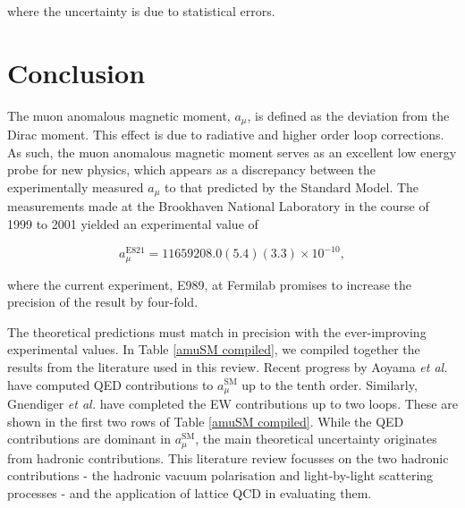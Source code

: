 \documentclass{article}
\numberwithin{equation}{section} %
\begin{document}
\noindent where the uncertainty is due to statistical errors.

\section{Conclusion}

The muon anomalous magnetic moment, $a_\mu$, is defined as the deviation from the Dirac moment\cite{zee}. This effect is due to radiative and higher order loop corrections. As such, the muon anomalous magnetic moment serves as an excellent low energy probe for new physics\cite{millerg2}, which appears as a discrepancy between the experimentally measured $a_\mu$ to that predicted by the Standard Model. The measurements made at the Brookhaven National Laboratory in the course of 1999 to 2001 yielded an experimental value of \cite{millerg2}

\begin{equation}
a_\mu^{\mathrm{E821}} = 11 659 208.0(5.4)(3.3) \times 10^{-10},
\end{equation}

\noindent where the current experiment, E989, at Fermilab promises to increase the precision of the result by four-fold\cite{fermilab}.

The theoretical predictions must match in precision with the ever-improving experimental values. In Table \ref{amuSM compiled}, we compiled together the results from the literature used in this review. Recent progress by Aoyama \textit{et al.} have computed QED contributions to $a_\mu^\mathrm{SM}$ up to the tenth order. Similarly, Gnendiger \textit{et al.} have completed the EW contributions up to two loops. These are shown in the first two rows of Table \ref{amuSM compiled}. While the QED contributions are dominant in $a_\mu^\mathrm{SM}$, the main theoretical uncertainty originates from hadronic contributions. This literature review focusses on the two hadronic contributions - the hadronic vacuum polarisation and light-by-light scattering processes - and the application of lattice QCD in evaluating them.
\end{document}
